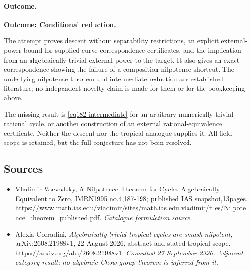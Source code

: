 \documentclass[11pt,a4paper]{article}
\numberwithin{equation}{section}
\begin{document}
\paragraph{Outcome.}
\textbf{Outcome: Conditional reduction.}

The attempt proves descent without separability restrictions, an explicit
external-power bound for supplied curve-correspondence certificates, and
the implication from an algebraically trivial external power to the target.
It also gives an exact correspondence showing the failure of a
composition-nilpotence shortcut. The underlying nilpotence theorem and
intermediate reduction are established literature; no independent novelty
claim is made for them or for the bookkeeping above.

The missing result is \eqref{eq182-intermediate} for an arbitrary
numerically trivial rational cycle, or another construction of an external
rational-equivalence certificate. Neither the descent nor the tropical
analogue supplies it. All-field scope is retained, but the full conjecture
has not been resolved.
\subsection{Sources}
\begin{itemize}\raggedright
\item[\textnormal{[S1]}]\hypertarget{source:30006776:1}{} Vladimir Voevodsky, A Nilpotence Theorem for Cycles Algebraically Equivalent to Zero, IMRN1995 no.4,187-198; published IAS snapshot,13pages.
\url{https://www.math.ias.edu/vladimir/sites/math.ias.edu.vladimir/files/Nilpotence_theorem_published.pdf}.
{\small\textit{Catalogue formulation source.}}
\item[\textnormal{[E1]}]\hypertarget{extra:30006776:1}{} Alexia Corradini,
\emph{Algebraically trivial tropical cycles are smash-nilpotent},
arXiv:2608.21988v1, 22 August 2026, abstract and stated tropical scope.
\url{https://arxiv.org/abs/2608.21988v1}.
{\small\textit{Consulted 27 September 2026. Adjacent-category result;
no algebraic Chow-group theorem is inferred from it.}}
\end{itemize}
\end{document}
